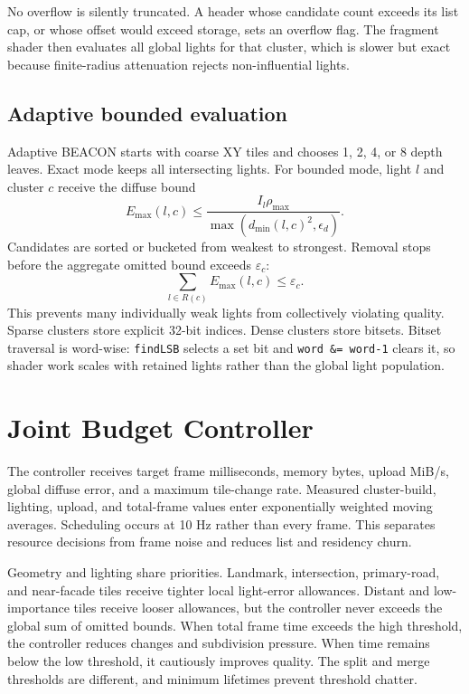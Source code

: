 \documentclass[10pt,twocolumn]{article}
\begin{document}
No overflow is silently truncated. A header whose candidate count exceeds its list cap, or whose
offset would exceed storage, sets an overflow flag. The fragment shader then evaluates all global
lights for that cluster, which is slower but exact because finite-radius attenuation rejects
non-influential lights.

\subsection{Adaptive bounded evaluation}
Adaptive BEACON starts with coarse XY tiles and chooses 1, 2, 4, or 8 depth leaves. Exact mode keeps
all intersecting lights. For bounded mode, light $l$ and cluster $c$ receive the diffuse bound
\begin{equation}
E_{\max}(l,c)\le
\frac{I_l\rho_{\max}}{\max(d_{\min}(l,c)^2,\epsilon_d)}.
\end{equation}
Candidates are sorted or bucketed from weakest to strongest. Removal stops before the aggregate
omitted bound exceeds $\varepsilon_c$:
\begin{equation}
\sum_{l\in R(c)}E_{\max}(l,c)\le\varepsilon_c.
\end{equation}
This prevents many individually weak lights from collectively violating quality. Sparse clusters
store explicit 32-bit indices. Dense clusters store bitsets. Bitset traversal is word-wise:
\texttt{findLSB} selects a set bit and \texttt{word \&= word-1} clears it, so shader work scales with
retained lights rather than the global light population.

\clearpage
\section{Joint Budget Controller}
The controller receives target frame milliseconds, memory bytes, upload MiB/s, global diffuse error,
and a maximum tile-change rate. Measured cluster-build, lighting, upload, and total-frame values
enter exponentially weighted moving averages. Scheduling occurs at 10 Hz rather than every frame.
This separates resource decisions from frame noise and reduces list and residency churn.

Geometry and lighting share priorities. Landmark, intersection, primary-road, and near-facade tiles
receive tighter local light-error allowances. Distant and low-importance tiles receive looser
allowances, but the controller never exceeds the global sum of omitted bounds. When total frame time
exceeds the high threshold, the controller reduces changes and subdivision pressure. When time
remains below the low threshold, it cautiously improves quality. The split and merge thresholds are
different, and minimum lifetimes prevent threshold chatter.
\end{document}
